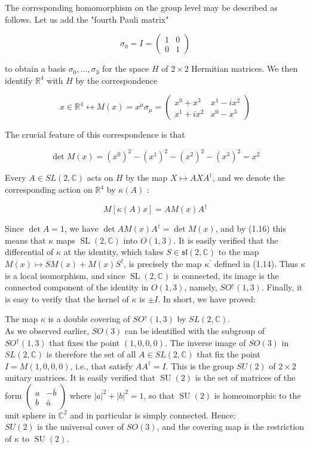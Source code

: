 \documentclass[10pt, letterpaper]{article}
\begin{document}
The corresponding homomorphism on the group level may be described as follows. Let us add the "fourth Pauli matrix"

$$
\sigma_{0}=I=\left(\begin{array}{ll}
1 & 0 \\
0 & 1
\end{array}\right)
$$

to obtain a basis $\sigma_{0}, \ldots, \sigma_{3}$ for the space $H$ of $2 \times 2$ Hermitian matrices. We then identify $\mathbb{R}^{4}$ with $H$ by the correspondence

$$
x \in \mathbb{R}^{4} \longleftrightarrow M(x)=x^{\mu} \sigma_{\mu}=\left(\begin{array}{cc}
x^{0}+x^{3} & x^{1}-i x^{2} \\
x^{1}+i x^{2} & x^{0}-x^{3}
\end{array}\right)
$$

The crucial feature of this correspondence is that

$$
\operatorname{det} M(x)=\left(x^{0}\right)^{2}-\left(x^{1}\right)^{2}-\left(x^{2}\right)^{2}-\left(x^{3}\right)^{2}=x^{2}
$$

Every $A \in S L(2, \mathbb{C})$ acts on $H$ by the map $X \mapsto A X A^{\dagger}$, and we denote the corresponding action on $\mathbb{R}^{4}$ by $\kappa(A)$ :

$$
M[\kappa(A) x]=A M(x) A^{\dagger}
$$

Since $\operatorname{det} A=1$, we have $\operatorname{det} A M(x) A^{\dagger}=\operatorname{det} M(x)$, and by (1.16) this means that $\kappa$ maps $\operatorname{SL}(2, \mathbb{C})$ into $O(1,3)$. It is easily verified that the differential of $\kappa$ at the identity, which takes $S \in \mathfrak{s l}(2, \mathbb{C})$ to the map $M(x) \mapsto S M(x)+M(x) S^{\dagger}$, is precisely the map $\kappa^{\prime}$ defined in (1.14). Thus $\kappa$ is a local isomorphism, and since $\operatorname{SL}(2, \mathbb{C})$ is connected, its image is the connected component of the identity in $O(1,3)$, namely, $S O^{\uparrow}(1,3)$. Finally, it is easy to verify that the kernel of $\kappa$ is $\pm I$. In short, we have proved:

The map $\kappa$ is a double covering of $S O^{\uparrow}(1,3)$ by $S L(2, \mathbb{C})$.\\
As we observed earlier, $S O(3)$ can be identified with the subgroup of $S O^{\uparrow}(1,3)$ that fixes the point $(1,0,0,0)$. The inverse image of $S O(3)$ in $S L(2, \mathbb{C})$ is therefore the set of all $A \in S L(2, \mathbb{C})$ that fix the point $I=M(1,0,0,0)$, i.e., that satisfy $A A^{\dagger}=I$. This is the group $S U(2)$ of $2 \times 2$ unitary matrices. It is easily verified that $\operatorname{SU}(2)$ is the set of matrices of the form $\left(\begin{array}{cc}a & -\bar{b} \\ b & \bar{a}\end{array}\right)$ where $|a|^{2}+|b|^{2}=1$, so that $\operatorname{SU}(2)$ is homeomorphic to the unit sphere in $\mathbb{C}^{2}$ and in particular is simply connected. Hence:\\
$S U(2)$ is the universal cover of $S O(3)$, and the covering map is the restriction of $\kappa$ to $\operatorname{SU}(2)$.
\end{document}
